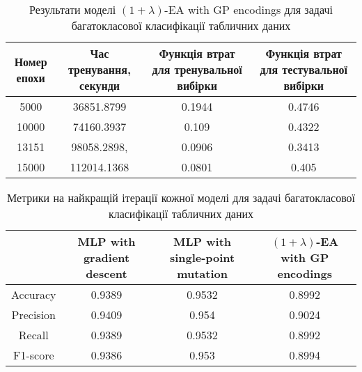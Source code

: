 \begin{table}[ht]
	\caption{Результати моделі $(1+\lambda)$-EA with GP encodings для задачі багатокласової класифікації табличних даних}
	\label{ea_mc_td_results}
	\centering
	\begin{adjustbox}{max width=\textwidth}
		\begin{tabular}{|c|c|c|c|}
			\hline 
			Номер епохи & Час тренування, секунди & Функція втрат для тренувальної вибірки & Функція втрат для тестувальної вибірки \\
			\hline 
			5000 & 36851.8799 & 0.1944 & 0.4746 \\
			\hline 
			10000 & 74160.3937 & 0.109 & 0.4322 \\
			\hline
			13151 & 98058.2898, & 0.0906 & 0.3413 \\
			\hline
			15000 & 112014.1368 & 0.0801 & 0.405 \\
			\hline
		\end{tabular}
	\end{adjustbox}
\end{table}

\begin{table}[ht]
	\caption{Метрики на найкращій ітерації кожної моделі для задачі багатокласової класифікації табличних даних}
	\label{metrics_mc_td_results}
	\centering
	\begin{adjustbox}{max width=\textwidth}
		\begin{tabular}{|c|c|c|c|}
			\hline 
			& MLP with gradient descent & MLP with single-point mutation & $(1+\lambda)$-EA with GP encodings \\
			\hline 
			Accuracy & 0.9389 & 0.9532 & 0.8992 \\
			\hline 
			Precision & 0.9409 & 0.954 & 0.9024 \\
			\hline
			Recall & 0.9389 & 0.9532 & 0.8992 \\
			\hline
			F1-score & 0.9386 & 0.953 & 0.8994 \\
			\hline
		\end{tabular}
	\end{adjustbox}
\end{table}

